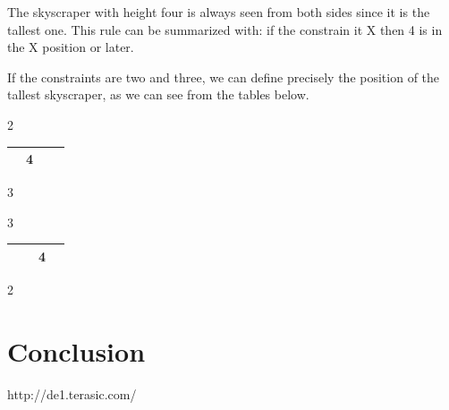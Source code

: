 \documentclass[12pt]{report}
\begin{document}
\begin{itemize}
    The skyscraper with height four is always seen from both sides since
    it is the tallest one. This rule can be summarized with: if the
    constrain it X then 4 is in the X position or later.

    If the constraints are two and three, we can define precisely the
    position of the tallest skyscraper, as we can see from the tables
    below.

\begin{center}
  2
  \begin{tabular}{| C{0.5cm} | C{0.5cm} | C{0.5cm} | C{0.5cm} |}
    \hline
    & 4 &  &  \tabularnewline \hline
  \end{tabular}
  3
\end{center}

\begin{center}
  3
  \begin{tabular}{| C{0.5cm} | C{0.5cm} | C{0.5cm} | C{0.5cm} |}
    \hline
    &  & 4 &  \tabularnewline \hline
  \end{tabular}
  2
\end{center}

\end{itemize}


\chapter*{Conclusion}


\renewcommand{\bibname}{References}
\begin{thebibliography}{100}

 http://de1.terasic.com/

\end{thebibliography}
\end{document}
